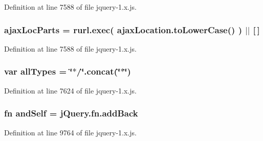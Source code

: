 Definition at line 7588 of file jquery-\/1.\+x.\+js.

\subsubsection[{\texorpdfstring{ajax\+Loc\+Parts}{ajaxLocParts}}]{\setlength{\rightskip}{0pt plus 5cm}ajax\+Loc\+Parts = rurl.\+exec( ajax\+Location.\+to\+Lower\+Case() ) $\vert$$\vert$ \mbox{[}$\,$\mbox{]}}\hypertarget{jquery-1_8x_8js_a4c35110da3c335cfca38505ee65a5e79}{}\label{jquery-1_8x_8js_a4c35110da3c335cfca38505ee65a5e79}


Definition at line 7588 of file jquery-\/1.\+x.\+js.

\subsubsection[{\texorpdfstring{all\+Types}{allTypes}}]{\setlength{\rightskip}{0pt plus 5cm}var all\+Types = \char`\"{}$\ast$/\char`\"{}.concat(\char`\"{}$\ast$\char`\"{})}\hypertarget{jquery-1_8x_8js_a2d6199559f6d1e840af674910a329b04}{}\label{jquery-1_8x_8js_a2d6199559f6d1e840af674910a329b04}


Definition at line 7624 of file jquery-\/1.\+x.\+js.

\subsubsection[{\texorpdfstring{and\+Self}{andSelf}}]{ {\bf fn} and\+Self = j\+Query.\+fn.\+add\+Back}\hypertarget{jquery-1_8x_8js_a63df20b949f6e6fc37d300a41fd9c02b}{}\label{jquery-1_8x_8js_a63df20b949f6e6fc37d300a41fd9c02b}


Definition at line 9764 of file jquery-\/1.\+x.\+js.

